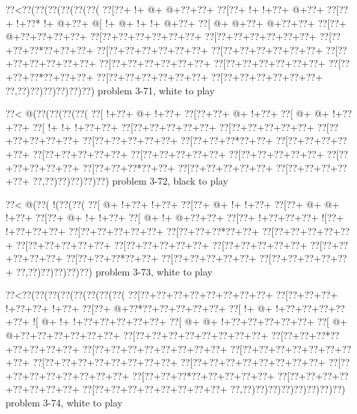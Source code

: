 \vbox{\vbox{\goo
\0??<\0??(\0??(\0??(\0??(\0??(\0??(
\0??[\0??+\- !+\- @+\- @+\0??+\0??+
\0??[\0??+\- !+\- !+\0??+\- @+\0??+
\0??[\0??+\- !+\0??*\- !+\- @+\0??+
\- @[\- !+\- @+\- !+\- !+\- @+\0??+
\0??[\- @+\- @+\0??+\- @+\0??+\0??+
\0??[\0??+\- @+\0??+\0??+\0??+\0??+
\0??[\0??+\0??+\0??+\0??+\0??+\0??+
\0??[\0??+\0??+\0??+\0??+\0??+\0??+
\0??[\0??+\0??+\0??*\0??+\0??+\0??+
\0??[\0??+\0??+\0??+\0??+\0??+\0??+
\0??[\0??+\0??+\0??+\0??+\0??+\0??+
\0??[\0??+\0??+\0??+\0??+\0??+\0??+
\0??[\0??+\0??+\0??+\0??+\0??+\0??+
\0??[\0??+\0??+\0??+\0??+\0??+\0??+
\0??[\0??+\0??+\0??*\0??+\0??+\0??+
\0??[\0??+\0??+\0??+\0??+\0??+\0??+
\0??[\0??+\0??+\0??+\0??+\0??+\0??+
\0??,\0??)\0??)\0??)\0??)\0??)\0??)
}
\hfil problem 3-71, white to play\hfil\break
}

\vbox{\vbox{\goo
\0??<\- @(\0??(\0??(\0??(\0??(
\0??[\- !+\0??+\- @+\- !+\0??+
\0??[\0??+\0??+\- @+\- !+\0??+
\0??[\- @+\- @+\- !+\0??+\0??+
\0??[\- !+\- !+\- !+\0??+\0??+
\0??[\0??+\0??+\0??+\0??+\0??+
\0??[\0??+\0??+\0??+\0??+\0??+
\0??[\0??+\0??+\0??+\0??+\0??+
\0??[\0??+\0??+\0??+\0??+\0??+
\0??[\0??+\0??+\0??*\0??+\0??+
\0??[\0??+\0??+\0??+\0??+\0??+
\0??[\0??+\0??+\0??+\0??+\0??+
\0??[\0??+\0??+\0??+\0??+\0??+
\0??[\0??+\0??+\0??+\0??+\0??+
\0??[\0??+\0??+\0??+\0??+\0??+
\0??[\0??+\0??+\0??*\0??+\0??+
\0??[\0??+\0??+\0??+\0??+\0??+
\0??[\0??+\0??+\0??+\0??+\0??+
\0??,\0??)\0??)\0??)\0??)\0??)
}
\hfil problem 3-72, black to play\hfil\break
}

\vbox{\vbox{\goo
\0??<\- @(\0??(\- !(\0??(\0??(
\0??[\- @+\- !+\0??+\- !+\0??+
\0??[\0??+\- @+\- !+\- !+\0??+
\0??[\0??+\- @+\- @+\- !+\0??+
\0??[\0??+\- @+\- !+\- !+\0??+
\0??[\- @+\- !+\- @+\0??+\0??+
\0??[\0??+\- !+\0??+\0??+\0??+
\- ![\0??+\- !+\0??+\0??+\0??+
\0??[\0??+\0??+\0??+\0??+\0??+
\0??[\0??+\0??+\0??*\0??+\0??+
\0??[\0??+\0??+\0??+\0??+\0??+
\0??[\0??+\0??+\0??+\0??+\0??+
\0??[\0??+\0??+\0??+\0??+\0??+
\0??[\0??+\0??+\0??+\0??+\0??+
\0??[\0??+\0??+\0??+\0??+\0??+
\0??[\0??+\0??+\0??*\0??+\0??+
\0??[\0??+\0??+\0??+\0??+\0??+
\0??[\0??+\0??+\0??+\0??+\0??+
\0??,\0??)\0??)\0??)\0??)\0??)
}
\hfil problem 3-73, white to play\hfil\break
}

\vbox{\vbox{\goo
\0??<\0??(\0??(\0??(\0??(\0??(\0??(\0??(\0??(
\0??[\0??+\0??+\0??+\0??+\0??+\0??+\0??+\0??+
\0??[\0??+\0??+\0??+\- !+\0??+\0??+\- !+\0??+
\0??[\0??+\- @+\0??*\0??+\0??+\0??+\0??+\0??+
\0??[\- !+\- @+\- !+\0??+\0??+\0??+\0??+\0??+
\- ![\- @+\- !+\- !+\0??+\0??+\0??+\0??+\0??+
\0??[\- @+\- @+\- !+\0??+\0??+\0??+\0??+\0??+
\0??[\- @+\- @+\0??+\0??+\0??+\0??+\0??+\0??+
\0??[\0??+\0??+\0??+\0??+\0??+\0??+\0??+\0??+
\0??[\0??+\0??+\0??*\0??+\0??+\0??+\0??+\0??+
\0??[\0??+\0??+\0??+\0??+\0??+\0??+\0??+\0??+
\0??[\0??+\0??+\0??+\0??+\0??+\0??+\0??+\0??+
\0??[\0??+\0??+\0??+\0??+\0??+\0??+\0??+\0??+
\0??[\0??+\0??+\0??+\0??+\0??+\0??+\0??+\0??+
\0??[\0??+\0??+\0??+\0??+\0??+\0??+\0??+\0??+
\0??[\0??+\0??+\0??*\0??+\0??+\0??+\0??+\0??+
\0??[\0??+\0??+\0??+\0??+\0??+\0??+\0??+\0??+
\0??[\0??+\0??+\0??+\0??+\0??+\0??+\0??+\0??+
\0??,\0??)\0??)\0??)\0??)\0??)\0??)\0??)\0??)
}
\hfil problem 3-74, white to play\hfil\break
}

